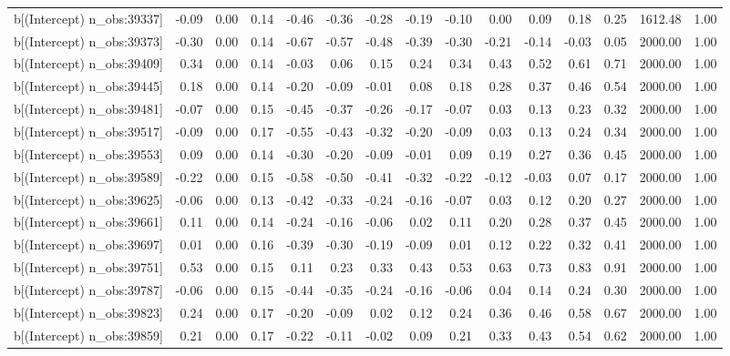 \begin{table}[ht]
\begin{tabular}{rrrrrrrrrrrrrrr}
  b[(Intercept) n\_obs:39337] & -0.09 & 0.00 & 0.14 & -0.46 & -0.36 & -0.28 & -0.19 & -0.10 & 0.00 & 0.09 & 0.18 & 0.25 & 1612.48 & 1.00 \\ 
  b[(Intercept) n\_obs:39373] & -0.30 & 0.00 & 0.14 & -0.67 & -0.57 & -0.48 & -0.39 & -0.30 & -0.21 & -0.14 & -0.03 & 0.05 & 2000.00 & 1.00 \\ 
  b[(Intercept) n\_obs:39409] & 0.34 & 0.00 & 0.14 & -0.03 & 0.06 & 0.15 & 0.24 & 0.34 & 0.43 & 0.52 & 0.61 & 0.71 & 2000.00 & 1.00 \\ 
  b[(Intercept) n\_obs:39445] & 0.18 & 0.00 & 0.14 & -0.20 & -0.09 & -0.01 & 0.08 & 0.18 & 0.28 & 0.37 & 0.46 & 0.54 & 2000.00 & 1.00 \\ 
  b[(Intercept) n\_obs:39481] & -0.07 & 0.00 & 0.15 & -0.45 & -0.37 & -0.26 & -0.17 & -0.07 & 0.03 & 0.13 & 0.23 & 0.32 & 2000.00 & 1.00 \\ 
  b[(Intercept) n\_obs:39517] & -0.09 & 0.00 & 0.17 & -0.55 & -0.43 & -0.32 & -0.20 & -0.09 & 0.03 & 0.13 & 0.24 & 0.34 & 2000.00 & 1.00 \\ 
  b[(Intercept) n\_obs:39553] & 0.09 & 0.00 & 0.14 & -0.30 & -0.20 & -0.09 & -0.01 & 0.09 & 0.19 & 0.27 & 0.36 & 0.45 & 2000.00 & 1.00 \\ 
  b[(Intercept) n\_obs:39589] & -0.22 & 0.00 & 0.15 & -0.58 & -0.50 & -0.41 & -0.32 & -0.22 & -0.12 & -0.03 & 0.07 & 0.17 & 2000.00 & 1.00 \\ 
  b[(Intercept) n\_obs:39625] & -0.06 & 0.00 & 0.13 & -0.42 & -0.33 & -0.24 & -0.16 & -0.07 & 0.03 & 0.12 & 0.20 & 0.27 & 2000.00 & 1.00 \\ 
  b[(Intercept) n\_obs:39661] & 0.11 & 0.00 & 0.14 & -0.24 & -0.16 & -0.06 & 0.02 & 0.11 & 0.20 & 0.28 & 0.37 & 0.45 & 2000.00 & 1.00 \\ 
  b[(Intercept) n\_obs:39697] & 0.01 & 0.00 & 0.16 & -0.39 & -0.30 & -0.19 & -0.09 & 0.01 & 0.12 & 0.22 & 0.32 & 0.41 & 2000.00 & 1.00 \\ 
  b[(Intercept) n\_obs:39751] & 0.53 & 0.00 & 0.15 & 0.11 & 0.23 & 0.33 & 0.43 & 0.53 & 0.63 & 0.73 & 0.83 & 0.91 & 2000.00 & 1.00 \\ 
  b[(Intercept) n\_obs:39787] & -0.06 & 0.00 & 0.15 & -0.44 & -0.35 & -0.24 & -0.16 & -0.06 & 0.04 & 0.14 & 0.24 & 0.30 & 2000.00 & 1.00 \\ 
  b[(Intercept) n\_obs:39823] & 0.24 & 0.00 & 0.17 & -0.20 & -0.09 & 0.02 & 0.12 & 0.24 & 0.36 & 0.46 & 0.58 & 0.67 & 2000.00 & 1.00 \\ 
  b[(Intercept) n\_obs:39859] & 0.21 & 0.00 & 0.17 & -0.22 & -0.11 & -0.02 & 0.09 & 0.21 & 0.33 & 0.43 & 0.54 & 0.62 & 2000.00 & 1.00 \\ 

\end{tabular}
\end{table}

